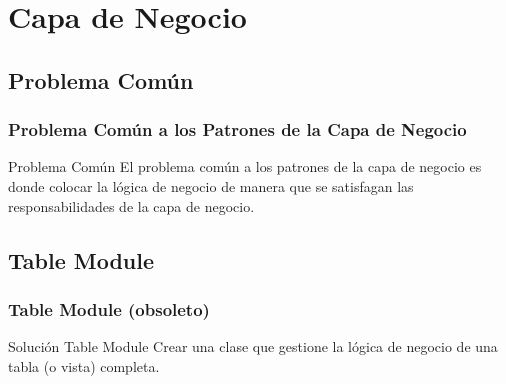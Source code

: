 \documentclass[a4paper,slidestop,xcolor=pst,dvips,blue]{beamer}
\begin{document}
%

\section{Capa de Negocio}

\subsection{Problema Común}

\begin{frame}[c]
    \frametitle{Problema Común a los Patrones de la Capa de Negocio}
    \begin{block}{Problema Común}
        El problema común a los patrones de la capa de negocio es donde colocar la
        lógica de negocio de manera que se satisfagan las responsabilidades de la capa de negocio.
    \end{block}
\end{frame}

\subsection{Table Module}

\begin{frame}[c]
    \frametitle{Table Module (obsoleto)}
    \begin{block}{Solución Table Module}
        Crear una clase que gestione la lógica de negocio de una tabla (o vista) completa.
    \end{block}
\end{frame}
\end{document}

